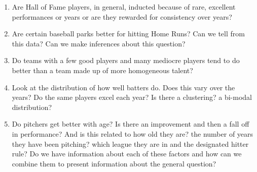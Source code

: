 \begin{enumerate}
\item Are Hall of Fame players, in general, inducted because of rare, excellent performances or years or are they rewarded for consistency over years?
\item Are certain baseball parks better for hitting Home Runs? Can we tell from this data? Can we make inferences about this question?
\item Do teams with a few good players and many mediocre players tend to do better than a team made up of more homogeneous talent?
\item Look at the distribution of how well batters do. Does this vary over the years? Do the same players excel each year? Is there a clustering? a bi-modal distribution?
\item Do pitchers get better with age? Is there an improvement and then a fall off in performance? And is this related to how old they are? the number of years they have been pitching? which league they are in and the designated hitter rule? Do we have information about each of these factors and how can we combine them to present information about the general question?
\end{enumerate} 

%
%
